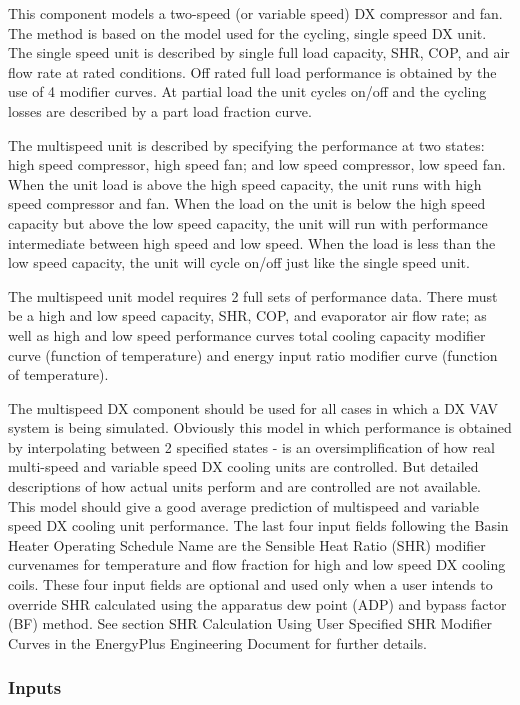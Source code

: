 This component models a two-speed (or variable speed) DX compressor and fan. The method is based on the model used for the cycling, single speed DX unit. The single speed unit is described by single full load capacity, SHR, COP, and air flow rate at rated conditions. Off rated full load performance is obtained by the use of 4 modifier curves. At partial load the unit cycles on/off and the cycling losses are described by a part load fraction curve.

The multispeed unit is described by specifying the performance at two states: high speed compressor, high speed fan; and low speed compressor, low speed fan. When the unit load is above the high speed capacity, the unit runs with high speed compressor and fan. When the load on the unit is below the high speed capacity but above the low speed capacity, the unit will run with performance intermediate between high speed and low speed. When the load is less than the low speed capacity, the unit will cycle on/off just like the single speed unit.

The multispeed unit model requires 2 full sets of performance data. There must be a high and low speed capacity, SHR, COP, and evaporator air flow rate; as well as high and low speed performance curves total cooling capacity modifier curve (function of temperature) and energy input ratio modifier curve (function of temperature).

The multispeed DX component should be used for all cases in which a DX VAV system is being simulated. Obviously this model in which performance is obtained by interpolating between 2 specified states - is an oversimplification of how real multi-speed and variable speed DX cooling units are controlled. But detailed descriptions of how actual units perform and are controlled are not available. This model should give a good average prediction of multispeed and variable speed DX cooling unit performance. The last four input fields following the Basin Heater Operating Schedule Name are the Sensible Heat Ratio (SHR) modifier curvenames for temperature and flow fraction for high and low speed DX cooling coils. These four input fields are optional and used only when a user intends to override SHR calculated using the apparatus dew point (ADP) and bypass factor (BF) method. See section SHR Calculation Using User Specified SHR Modifier Curves in the EnergyPlus Engineering Document for further details.

\subsubsection{Inputs}\label{inputs-14-004}

